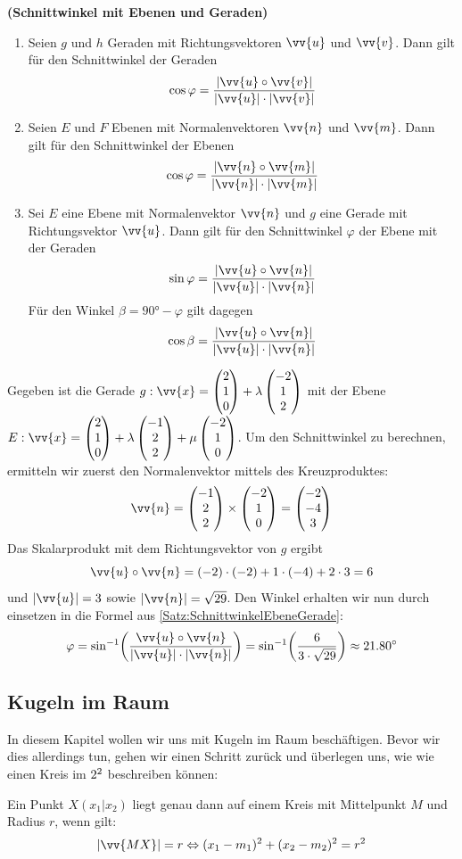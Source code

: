 \documentclass[ngerman, 12pt]{nssheetxea}
\begin{document}
\begin{theorem} \textbf{(Schnittwinkel mit Ebenen und Geraden)}  \par
\begin{enumerate}
\item Seien $g$ und $h$ Geraden mit Richtungsvektoren $\vv{u}$ und $\vv{v}$. Dann gilt für den Schnittwinkel der Geraden
\[ \cos \varphi = \dfrac{|\vv{u} \circ \vv{v}|}{|\vv{u}| \cdot |\vv{v}|}\]
\item Seien $E$ und $F$ Ebenen mit Normalenvektoren $\vv{n}$ und $\vv{m}$. Dann gilt für den Schnittwinkel der Ebenen
\[ \cos \varphi = \dfrac{|\vv{n} \circ \vv{m}|}{|\vv{n}| \cdot |\vv{m}|}\]
\item Sei $E$ eine Ebene mit Normalenvektor $\vv{n}$ und $g$ eine Gerade  mit Richtungsvektor $\vv{u}$. Dann gilt für den Schnittwinkel $\varphi$ der Ebene mit der Geraden
\[ \sin \varphi = \dfrac{|\vv{u} \circ \vv{n}|}{|\vv{u}| \cdot |\vv{n}|}\]
Für den Winkel $\beta = \ang{90}-\varphi$ gilt dagegen
\[ \cos \beta = \dfrac{|\vv{u} \circ \vv{n}|}{|\vv{u}| \cdot |\vv{n}|}\]
\end{enumerate}
\label{Satz:SchnittwinkelEbeneGerade}
\end{theorem}

\begin{example}
Gegeben ist die Gerade $g:\vv{x}=\colvec[2]{1}{0}+\lambda \colvec[-2]{1}{2}$ mit der Ebene $E:\vv{x}=\colvec[2]{1}{0}+\lambda \colvec[-1]{2}{2}+\mu \colvec[-2]{1}{0}$. Um den Schnittwinkel zu berechnen, ermitteln wir zuerst den Normalenvektor mittels des Kreuzproduktes:
\[ \vv{n}  = \colvec[-1]{2}{2} \times \colvec[-2]{1}{0} = \colvec[-2]{-4}{3}  \]
Das Skalarprodukt mit dem Richtungsvektor von $g$ ergibt 
\[ \vv{u} \circ \vv{n} = (-2) \cdot (-2) + 1 \cdot (-4) + 2 \cdot 3 = 6 \]
und $|\vv{u}| = 3$ sowie $|\vv{n}|=\sqrt{29}$. Den Winkel erhalten wir nun durch einsetzen in die Formel aus \ref{Satz:SchnittwinkelEbeneGerade}:
\[ \varphi = \sin^{-1} \mleft( \dfrac{\vv{u}\circ \vv{n}}{|\vv{u}| \cdot |\vv{n}|}  \mright) = \sin^{-1}\mleft( \dfrac{6}{3 \cdot \sqrt{29}}  \mright) \approx \ang{21,80} \]
\end{example}

\subsection{Kugeln im Raum}
In diesem Kapitel wollen wir uns mit Kugeln im Raum beschäftigen. Bevor wir dies allerdings tun, gehen wir einen Schritt zurück und überlegen uns, wie wie einen Kreis im $2^2$ beschreiben können: \par
Ein Punkt $X(x_1|x_2)$ liegt genau dann auf einem Kreis mit Mittelpunkt $M$ und Radius $r$, wenn gilt:
\[ |\vv{MX}| = r \Leftrightarrow (x_1-m_1)^2+(x_2-m_2)^2 = r^2  \]
\end{document}
